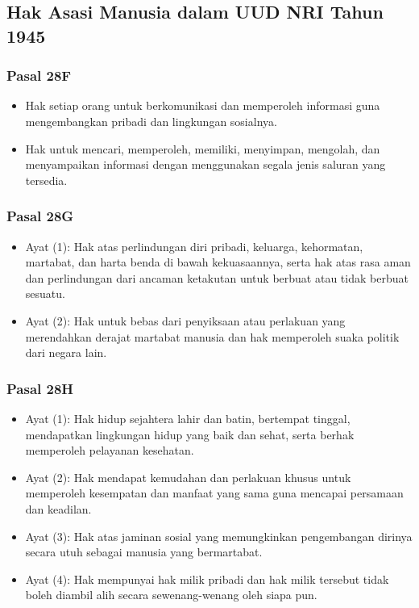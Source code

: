 \subsection{Hak Asasi Manusia dalam UUD NRI Tahun 1945}

\subsubsection{Pasal 28F}
\begin{itemize}
\item Hak setiap orang untuk berkomunikasi dan memperoleh informasi guna mengembangkan pribadi dan lingkungan sosialnya.
\item Hak untuk mencari, memperoleh, memiliki, menyimpan, mengolah, dan menyampaikan informasi dengan menggunakan segala jenis saluran yang tersedia.
\end{itemize}

\subsubsection{Pasal 28G}
\begin{itemize}
\item Ayat (1): Hak atas perlindungan diri pribadi, keluarga, kehormatan, martabat, dan harta benda di bawah kekuasaannya, serta hak atas rasa aman dan perlindungan dari ancaman ketakutan untuk berbuat atau tidak berbuat sesuatu.
\item Ayat (2): Hak untuk bebas dari penyiksaan atau perlakuan yang merendahkan derajat martabat manusia dan hak memperoleh suaka politik dari negara lain.
\end{itemize}

\subsubsection{Pasal 28H}
\begin{itemize}
\item Ayat (1): Hak hidup sejahtera lahir dan batin, bertempat tinggal, mendapatkan lingkungan hidup yang baik dan sehat, serta berhak memperoleh pelayanan kesehatan.
\item Ayat (2): Hak mendapat kemudahan dan perlakuan khusus untuk memperoleh kesempatan dan manfaat yang sama guna mencapai persamaan dan keadilan.
\item Ayat (3): Hak atas jaminan sosial yang memungkinkan pengembangan dirinya secara utuh sebagai manusia yang bermartabat.
\item Ayat (4): Hak mempunyai hak milik pribadi dan hak milik tersebut tidak boleh diambil alih secara sewenang-wenang oleh siapa pun.
\end{itemize}

